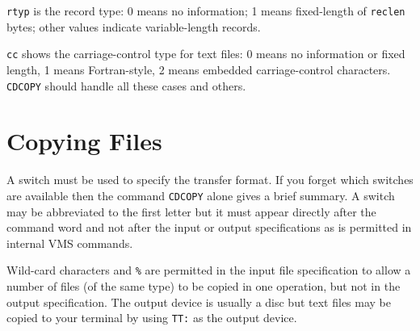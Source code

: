 {\tt rtyp} is the record type: 0 means no information; 1 means
fixed-length of {\tt reclen} bytes; other values indicate
variable-length records.

{\tt cc} shows the carriage-control type for text files: 0 means no
information or fixed length, 1 means Fortran-style, 2 means embedded
carriage-control characters.  {\tt CDCOPY} should handle all these cases
and others.

\section{Copying Files}
A switch must be used to specify the transfer format.  If you forget
which switches are available then the command {\tt CDCOPY} alone gives a
brief summary.  A switch may be abbreviated to the first letter but it must
appear directly after the command word and not after the input or output
specifications as is permitted in internal VMS commands.

Wild-card characters {\tt *} and {\tt \%} are permitted in the input
file specification to allow a number of files (of the same type) to be
copied in one operation, but not in the output specification.
The output device is usually a disc but text files may be
copied to your terminal by using {\tt TT:} as the output device.

